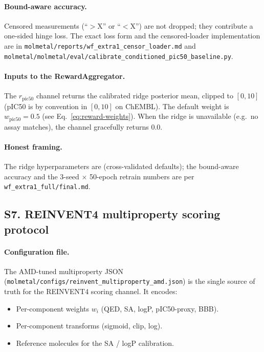 \paragraph{Bound-aware accuracy.}
Censored measurements (``$>$X'' or ``$<$X'') are not dropped; they
contribute a one-sided hinge loss.  The exact loss form and the
censored-loader implementation are in
\texttt{molmetal/reports/wf\_extra1\_censor\_loader.md} and
\texttt{molmetal/molmetal/eval/calibrate\_conditioned\_pic50\_baseline.py}.

\paragraph{Inputs to the RewardAggregator.}
The $r_{\text{pic50}}$ channel returns the calibrated ridge posterior
mean, clipped to $[0, 10]$ (pIC50 is by convention in $[0, 10]$ on
ChEMBL).  The default weight is $w_{\text{pic50}} = 0.5$ (see
Eq.~\ref{eq:reward-weights}).  When the ridge is unavailable (e.g.\ no
assay matches), the channel gracefully returns $0.0$.

\paragraph{Honest framing.}
The ridge hyperparameters are \DESIGN{} (cross-validated defaults);
the bound-aware accuracy and the 3-seed $\times$ 50-epoch retrain
numbers are \MEASURED{} per \texttt{wf\_extra1\_full/final.md}.


\subsection*{S7. REINVENT4 multiproperty scoring protocol}
\label{supp:s7-reinvent4}

\paragraph{Configuration file.}
The AMD-tuned multiproperty JSON
(\texttt{molmetal/configs/reinvent\_multiproperty\_amd.json}) is the
single source of truth for the REINVENT4 scoring channel.  It encodes:
\begin{itemize}
  \item Per-component weights $w_i$ (QED, SA, logP, pIC50-proxy, BBB).
  \item Per-component transforms (sigmoid, clip, log).
  \item Reference molecules for the SA / logP calibration.
\end{itemize}

